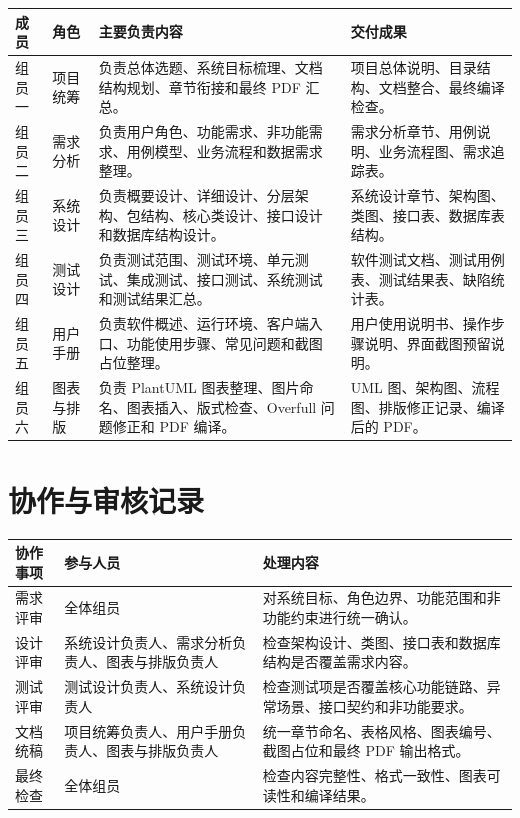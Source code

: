 \begin{longtable}{@{}p{2.0cm}p{2.5cm}p{4.2cm}p{4.8cm}@{}}
\toprule
成员 & 角色 & 主要负责内容 & 交付成果 \\
\midrule
组员一 & 项目统筹 & 负责总体选题、系统目标梳理、文档结构规划、章节衔接和最终 PDF 汇总。 & 项目总体说明、目录结构、文档整合、最终编译检查。 \\
组员二 & 需求分析 & 负责用户角色、功能需求、非功能需求、用例模型、业务流程和数据需求整理。 & 需求分析章节、用例说明、业务流程图、需求追踪表。 \\
组员三 & 系统设计 & 负责概要设计、详细设计、分层架构、包结构、核心类设计、接口设计和数据库结构设计。 & 系统设计章节、架构图、类图、接口表、数据库表结构。 \\
组员四 & 测试设计 & 负责测试范围、测试环境、单元测试、集成测试、接口测试、系统测试和测试结果汇总。 & 软件测试文档、测试用例表、测试结果表、缺陷统计表。 \\
组员五 & 用户手册 & 负责软件概述、运行环境、客户端入口、功能使用步骤、常见问题和截图占位整理。 & 用户使用说明书、操作步骤说明、界面截图预留说明。 \\
组员六 & 图表与排版 & 负责 PlantUML 图表整理、图片命名、图表插入、版式检查、Overfull 问题修正和 PDF 编译。 & UML 图、架构图、流程图、排版修正记录、编译后的 PDF。 \\
\bottomrule
\end{longtable}

\section{协作与审核记录}

\begin{longtable}{@{}p{3.0cm}p{4.2cm}p{6.0cm}@{}}
\toprule
协作事项 & 参与人员 & 处理内容 \\
\midrule
需求评审 & 全体组员 & 对系统目标、角色边界、功能范围和非功能约束进行统一确认。 \\
设计评审 & 系统设计负责人、需求分析负责人、图表与排版负责人 & 检查架构设计、类图、接口表和数据库结构是否覆盖需求内容。 \\
测试评审 & 测试设计负责人、系统设计负责人 & 检查测试项是否覆盖核心功能链路、异常场景、接口契约和非功能要求。 \\
文档统稿 & 项目统筹负责人、用户手册负责人、图表与排版负责人 & 统一章节命名、表格风格、图表编号、截图占位和最终 PDF 输出格式。 \\
最终检查 & 全体组员 & 检查内容完整性、格式一致性、图表可读性和编译结果。 \\
\bottomrule
\end{longtable}
